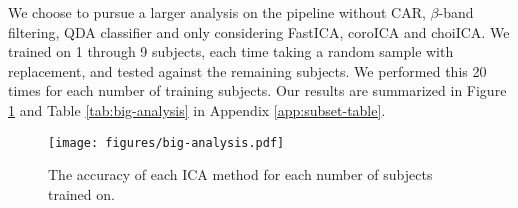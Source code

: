 	We choose to pursue a larger analysis on the pipeline without CAR, $\beta$-band filtering, QDA classifier and only considering FastICA, coroICA and choiICA. We trained on 1 through 9 subjects, each time taking a random sample with replacement, and tested against the remaining subjects. We performed this 20 times for each number of training subjects. Our results are summarized in Figure \ref{fig:big-analysis} and Table \ref{tab:big-analysis} in Appendix \ref{app:subset-table}.

	\begin{figure}
		\center
			\texttt{[image: figures/big-analysis.pdf]}
			\caption{The accuracy of each ICA method for each number of subjects trained on.}
		\label{fig:big-analysis}
	\end{figure}















